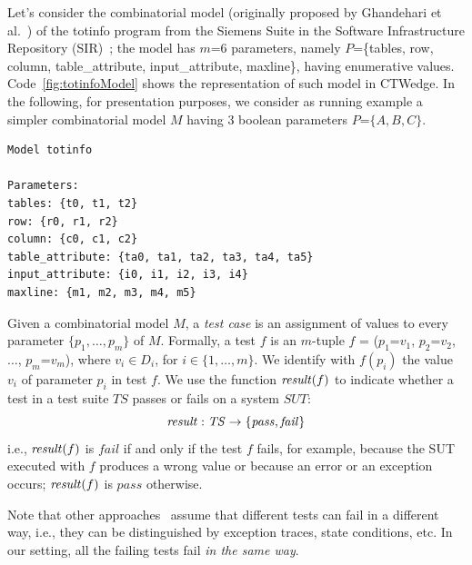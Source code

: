 \begin{tikzborder}{\cite{Gargantini16:validation}}
\begin{tikzborder}{\cite{gargantini_combinatorial_2017}}
\begin{tikzborder}{\cite{gargantini_combinatorial_2017}}
\begin{tikzborder}{\cite{garn2019}}
\begin{tikzborder}{\cite{arcaini2019achieving}}
\begin{tikzborder}{\cite{iwct19}}
\begin{example}\label{ex:model}
	Let's consider the combinatorial model (originally proposed by Ghandehari et al.~\cite{ghandehari_applying_2013}) of the \textsf{totinfo} program from the Siemens Suite in the Software Infrastructure Repository (SIR)~\cite{doESE05}; the model has $m$=6 parameters, namely $P$=\{tables, row, column, table\_attribute, input\_attribute, maxline\}, having enumerative values. Code~\ref{fig:totinfoModel} shows the representation of such model in CTWedge. In the following, for presentation purposes, we consider as running example a simpler combinatorial model $M$ having 3 boolean parameters $P$=$\{A, B, C\}$.
\end{example}
\end{tikzborder}

\begin{lstlisting}[basicstyle=\footnotesize\sffamily\linespread{1},frame = single,float,caption={A combinatorial model of the input of \textit{totinfo} program, in CTWedge},label={fig:totinfoModel}]
Model totinfo

Parameters:
tables: {t0, t1, t2}
row: {r0, r1, r2}
column: {c0, c1, c2}
table_attribute: {ta0, ta1, ta2, ta3, ta4, ta5}
input_attribute: {i0, i1, i2, i3, i4}
maxline: {m1, m2, m3, m4, m5}
\end{lstlisting}

\begin{tikzborder}{}
\begin{defn}\label{def:testCase}
	Given a combinatorial model $M$, a {\it test case} is an assignment of values to every parameter $\{p_1, \dots , p_m\}$ of $M$. Formally, a test $f$ is an $m$-tuple $f$ = ($p_1$=$v_1$, $p_2$=$v_2$, $\ldots$, $p_m$=$v_m$), where $v_i \in D_i$, for $i \in \{1, \ldots, m\}$. We identify with $f(p_i)$ the value $v_i$ of parameter $p_i$ in test $f$. We use the function $\mathit{result}(f)$ to indicate whether a test in a test suite $\mathit{TS}$ passes or fails on a system $\mathit{SUT}$: %
	\[\mathit{result}: \mathit{TS} \rightarrow \{\mathit{pass},\mathit{fail}\}\]
	i.e., $\mathit{result}(f)$ is $\mathit{fail}$ if and only if the test $f$ fails, for example, because the SUT executed with $f$ produces a wrong value or because an error or an exception occurs; $\mathit{result}(f)$ is $\mathit{pass}$ otherwise.
\end{defn}

Note that other approaches~\cite{Niu2018Identifying} assume that different tests can fail in a different way, i.e., they can be distinguished by exception traces, state conditions, etc. In our setting, all the failing tests fail {\it in the same way}.


\end{tikzborder}
\end{tikzborder}
\end{tikzborder}
\end{tikzborder}
\end{tikzborder}
\end{tikzborder}

